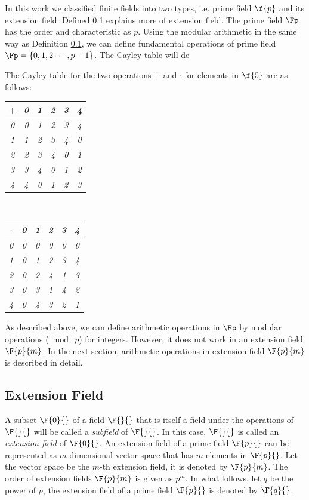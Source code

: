 In this work we classified finite fields into two types, i.e.  prime field $\f{p}$ and its extension field. 
Defined \ref{label_extenion_field} explains more of extension field.
The prime field $\Fp$ has  the order and characteristic as $p$.
Using the modular arithmetic in the same way as Definition \ref{label_extenion_field}, we can define fundamental operations of prime field $\Fp=\{0,1,2\cdots,p-1\}$.
The Cayley table will de
\begin{example}The Cayley table for the two operations $+$ and $\cdot$ for elements in $\f{5}$ are as follows:
	\begin{center}
		\begin{tabular}{c|ccccc}
			$+$&\em 0&\em 1&\em 2&\em 3&\em 4       \\
			\hline
			\em 0&\em 0&\em 1&\em 2&\em 3&\em 4       \\
			\em 1&\em 1&\em 2&\em 3&\em 4&\em 0      \\
			\em 2&\em 2&\em 3&\em 4&\em 0&\em 1      \\
			\em 3&\em 3&\em 4&\em 0&\em 1&\em 2      \\
			\em 4&\em 4&\em 0&\em 1&\em 2&\em 3      \\
		\end{tabular}\ \ 
		\begin{tabular}{c|ccccc}
			$\cdot$&\em 0&\em 1&\em 2&\em 3&\em 4       \\
			\hline
			\em 0&\em 0&\em 0&\em 0&\em 0&\em 0       \\
			\em 1&\em 0&\em 1&\em 2&\em 3&\em 4      \\
			\em 2&\em 0&\em 2&\em 4&\em 1&\em 3      \\
			\em 3&\em 0&\em 3&\em 1&\em 4&\em 2      \\
			\em 4&\em 0&\em 4&\em 3&\em 2&\em 1      \\
		\end{tabular}
	\end{center}
\end{example}
As described above, we can define arithmetic operations in $\Fp$ by modular operations ($\bmod\ p$) for integers. However, it does not work in an extension field $\F{p}{m}$. In the next section, arithmetic operations in extension field $\F{p}{m}$ is described in detail.


\subsection{Extension Field} \label{label_extenion_field}
A subset $\F{0}{}$ of a field $\F{}{}$ that is itself a field under the operations of $\F{}{}$ will be called a {\it subfield} of $\F{}{}$.
In this case, $\F{}{}$ is called an {\it extension field} of $\F{0}{}$.
An extension field of a prime field $\F{p}{}$ can be represented as $m$-dimensional vector space that has $m$ elements in $\F{p}{}$.
Let the vector space be the $m$-th extension field, it is denoted by $\F{p}{m}$.
The order of extension fields $\F{p}{m}$ is given as $p^m$. 
In what follows, let $q$ be the power of $p$, the extension field of a prime field $\F{p}{}$ is denoted by $\F{q}{}$.



